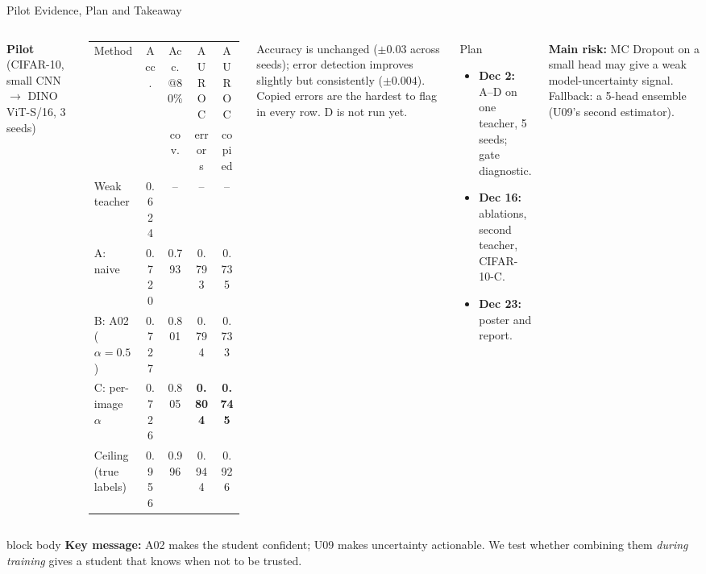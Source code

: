 \documentclass[aspectratio=169,11pt,professionalfonts]{beamer}
\newcommand{\keymsg}[1]{%
  \begin{beamercolorbox}[wd=\linewidth,rounded=true,sep=0.6em]{block body}
  \textbf{Key message:} #1
  \end{beamercolorbox}
}
\begin{document}
\begin{frame}[t]{Pilot Evidence, Plan and Takeaway}
\begin{columns}[T,totalwidth=\textwidth]
\small\textbf{Pilot} (CIFAR-10, small CNN $\to$ DINO ViT-S/16, 3 seeds)

\vspace{0.2em}
\scriptsize\setlength{\tabcolsep}{3pt}
\begin{tabular}{@{}lcccc@{}}
\toprule
Method & Acc. & Acc.@80\% & AUROC & AUROC\\
 & & cov. & errors & copied\\
\midrule
Weak teacher & 0.624 & -- & -- & --\\
A: naive & 0.720 & 0.793 & 0.793 & 0.735\\
B: A02 ($\alpha=0.5$) & 0.727 & 0.801 & 0.794 & 0.733\\
C: per-image $\alpha$ & 0.726 & 0.805 & \textbf{0.804} & \textbf{0.745}\\
Ceiling (true labels) & 0.956 & 0.996 & 0.944 & 0.926\\
\bottomrule
\end{tabular}

\vspace{0.3em}
\footnotesize
Accuracy is unchanged ($\pm0.03$ across seeds); error detection improves slightly but consistently
($\pm0.004$). Copied errors are the hardest to flag in every row. D is not run yet.
\begin{block}{Plan}
\footnotesize
\begin{itemize}
  \item \textbf{Dec 2:} A--D on one teacher, 5 seeds; gate diagnostic.
  \item \textbf{Dec 16:} ablations, second teacher, CIFAR-10-C.
  \item \textbf{Dec 23:} poster and report.
\end{itemize}
\end{block}
\footnotesize
\textbf{Main risk:} MC Dropout on a small head may give a weak model-uncertainty signal. Fallback: a
5-head ensemble (U09's second estimator).
\end{columns}
\vspace{0.3em}
\keymsg{A02 makes the student confident; U09 makes uncertainty actionable. We test whether combining them
\emph{during training} gives a student that knows when not to be trusted.}
\end{frame}
\end{document}
